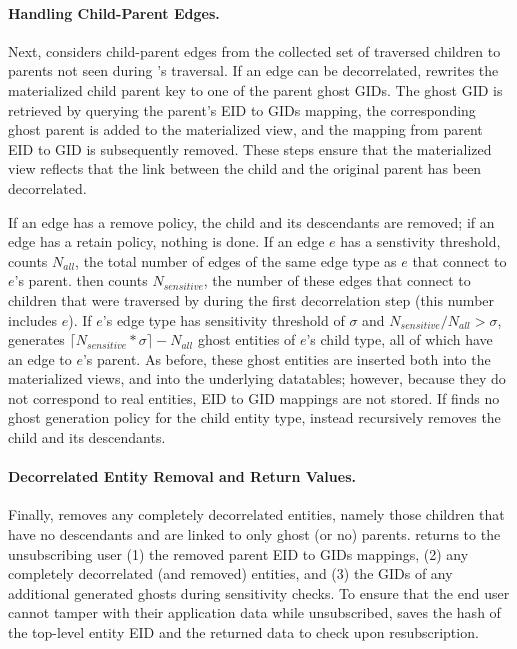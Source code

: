 \paragraph{Handling Child-Parent Edges.}
Next, \sys{} considers child-parent edges from the collected set of traversed children to parents
not seen during \sys{}'s traversal. If an 
edge can be decorrelated, \sys{} rewrites the materialized child parent key to one of the parent
ghost GIDs. The ghost GID is retrieved by querying the parent's EID to GIDs mapping, the
corresponding ghost parent is added to the materialized view,
and the mapping from parent EID to GID is subsequently removed. These steps ensure that the
materialized view reflects that the link between the child and the original parent has been
decorrelated.

If an edge has a remove policy, the child and its descendants are removed; if an edge has a retain
policy, nothing is done. 
If an edge $e$ has a senstivity threshold,
\sys{} counts $N_{all}$, the total number of edges of the same edge type as $e$ that connect to $e$'s parent.
\sys{} then counts $N_{sensitive}$, the number of these edges that connect to children that were traversed by \sys{} during the
first decorrelation step (this number includes $e$).
If $e$'s edge type has sensitivity threshold of $\sigma$ and $N_{sensitive} / N_{all} > \sigma$,
\sys{} generates $\lceil N_{sensitive}*\sigma\rceil - N_{all}$ ghost entities of $e$'s child type, all
of which have an edge to $e$'s parent.
As before, these ghost entities are inserted both into the materialized views, and into the underlying
datatables; however, because they do not correspond to real entities, EID to GID mappings are not
stored. 
If \sys{} finds no ghost generation policy for the child entity type, \sys{} instead recursively
removes the child and its descendants.

\paragraph{Decorrelated Entity Removal and Return Values.}
Finally, \sys{} removes any completely decorrelated entities, namely those children that have no
descendants and are linked to only ghost (or no) parents.
\sys{} returns to the unsubscribing user (1) the removed parent EID to GIDs mappings, (2) any completely decorrelated (and removed) entities,
and (3) the GIDs of any additional generated ghosts during sensitivity checks.
To ensure that the end user cannot tamper with their application data while unsubscribed, \sys{}
saves the hash of the top-level entity EID and the returned data to check upon resubscription.

